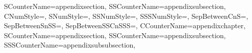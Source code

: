 {{    SCounterName=appendixsection,%
    SSCounterName=appendixsubsection,%
  }{\GetAppendixSubSectionNumberingFormatString}%
  {%
    CNumStyle=\GetAppendixSSSTitleNumberFormatCNumStyle,%
    SNumStyle=\GetAppendixSSSTitleNumberFormatSNumStyle,%
    SSNumStyle=\GetAppendixSSSTitleNumberFormatSSNumStyle,%
    SSSNumStyle=\GetAppendixSSSTitleNumberFormatSSSNumStyle,%
    SepBetweenCnS=\GetAppendixSSSTitleNumberFormatSepBetweenCnS,%
    SepBetweenSnSS=\GetAppendixSSSTitleNumberFormatSepBetweenSnSS,%
    SepBetweenSSCnSSS=\GetAppendixSSSTitleNumberFormatSepBetweenSSCnSSS,%
    CCounterName=appendixchapter,%
    SCounterName=appendixsection,%
    SSCounterName=appendixsubsection,%
    SSSCounterName=appendixsubsubsection,%
  }{\GetAppendixSubSubSectionNumberingFormatString}%
} %


\newcommand\SetupNumberingFormat
{%
  \InitinalGeneralAppendixNumberingFormatString%
  \SetupGeneralFigureNumberFormatString%
  \SetupGeneralTableNumberFormatString%
  \SetupGeneralEquationNumberFormatString%
  \renewcommand{\thefigure}{\GetGeneralFigureNumberFormatString}%
  \renewcommand{\thetable}{\GetGeneralTableNumberFormatString}%
  \renewcommand{\theequation}{\GetGeneralEquationNumberFormatString}%
} %

\newcommand\SetupAppendixNumberingFormat
{%
  \SetupAppendixFigureNumberFormatString%
  \SetupAppendixTableNumberFormatString%
  \SetupAppendixEquationNumberFormatString%
  \renewcommand{\thefigure}{\GetAppendixFigureNumberFormatString}
  \renewcommand{\thetable}{\GetAppendixTableNumberFormatString}
  \renewcommand{\theequation}{\GetAppendixEquationNumberFormatString}
} %

